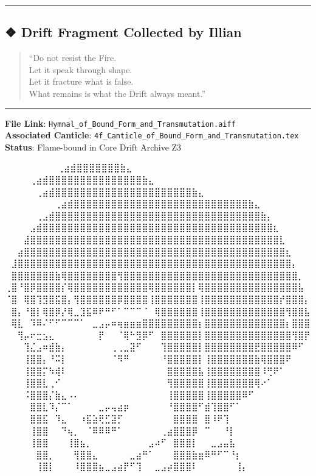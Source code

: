 \documentclass[
]{article}
\begin{document}
\begin{center}\rule{0.5\linewidth}{0.5pt}\end{center}

\hypertarget{drift-fragment-collected-by-illian-1}{%
\subsection{❖ Drift Fragment Collected by
Illian}\label{drift-fragment-collected-by-illian-1}}

\begin{quote}
``Do not resist the Fire.\\
Let it speak through shape.\\
Let it fracture what is false.\\
What remains is what the Drift always meant.''
\end{quote}

\begin{center}\rule{0.5\linewidth}{0.5pt}\end{center}

\textbf{File Link}:
\texttt{Hymnal\_of\_Bound\_Form\_and\_Transmutation.aiff}\\
\textbf{Associated Canticle}:
\texttt{4f\_Canticle\_of\_Bound\_Form\_and\_Transmutation.tex}\\
\textbf{Status}: Flame-bound in Core Drift Archive Z3

⠀⠀⠀⠀⠀⠀ ⠀⠀⢀⣴⣾⣿⣿⣿⣿⣿⣿⣿⣷⣄⠀⠀⠀⠀⠀⠀⠀⠀ ⠀⠀⠀ ⠀ ⠀⠀⠀⠀⢀⣴⣾⣿⣿⣿⣿⣿⣿⣿⣿⣿⣿⣿⣿⣿⣿⣿⣷⣄⠀⠀⠀⠀⠀⠀⠀⠀ ⠀⠀
⠀ ⠀⠀⠀⠀⠀⢀⣴⣾⣿⣿⣿⣿⣿⣿⣿⣿⣿⣿⣿⣿⣿⣿⣿⣿⣿⣿⣿⣿⣿⣿⣷⣄⠀⠀⠀⠀⠀⠀⠀⠀
⠀⠀⠀⠀⠀⠀⠀⠀⢀⣴⣾⣿⣿⣿⣿⣿⣿⣿⣿⣿⣿⣿⣿⣿⣿⣿⣿⣿⣿⣿⣿⣿⣿⣿⣿⣿⣿⣿⣿⣷⣄⠀⠀⠀⠀⠀⠀⠀⠀
⠀⠀⠀⠀⠀⢀⣠⣾⣿⣿⣿⣿⣿⣿⣿⣿⣿⣿⣿⣿⣿⣿⣿⣿⣿⣿⣿⣿⣿⣿⣿⣿⣿⣿⣿⣿⣿⣿⣿⣿⣿⣷⡄⠀⠀⠀⠀⠀⠀
⠀⠀⠀⠀⣠⣾⣿⣿⣿⣿⣿⣿⣿⣿⣿⣿⣿⣿⣿⣿⣿⣿⣿⣿⣿⣿⣿⣿⣿⣿⣿⣿⣿⣿⣿⣿⣿⣿⣿⣿⣿⣿⣿⣆⠀⠀⠀⠀⠀
⠀⠀⠀⣼⣿⣿⣿⣿⣿⣿⣿⣿⣿⣿⣿⣿⣿⣿⣿⣿⣿⣿⣿⣿⣿⣿⣿⣿⣿⣿⣿⣿⣿⣿⣿⣿⣿⣿⣿⣿⣿⣿⣿⣿⣇⠀⠀⠀⠀
⠀⠀⣴⣿⣿⣿⣿⣿⣿⣿⣿⣿⣿⣿⣿⣿⣿⣿⣿⣿⣿⣿⣿⣿⣿⣿⣿⣿⣿⣿⣿⣿⣿⣿⣿⣿⣿⣿⣿⣿⣿⣿⣿⣿⣿⣆⠀⠀⠀
⠀⣸⣿⣿⣿⣿⣿⣿⣿⣿⣿⣿⣿⣿⣿⣿⣿⣿⣿⣿⣿⣿⣿⣿⣿⣿⣿⣿⣿⣿⣿⣿⣿⣿⣿⣿⣿⣿⣿⣿⣿⣿⣿⣿⣿⣿⡄⠀⠀
⠀⣿⣿⣿⣿⣿⣿⣿⣷⢿⣿⣿⣿⣿⣿⣿⣿⣿⢻⣿⣿⣿⣿⣿⣿⣿⣿⣿⣿⣿⣿⣿⣿⣿⣿⣿⣿⣿⣿⣿⣿⣿⣿⣿⣿⣿⣿⡀⠀
⢀⣿⠘⣿⡿⣿⣿⣿⣿⡎⢿⣿⣿⣿⣿⣿⣿⣿⣿⣿⣿⣿⣿⢿⣿⣿⣿⣿⣿⣿⡇⢿⣿⣿⣿⣿⣿⣿⣿⣿⣿⣿⣿⣿⣿⣿⣿⣧⠀
⠈⣿⠀⢿⣿⢹⣻⣿⣯⣿⡄⢻⣿⣿⣿⣿⣿⣿⡿⣿⣿⣿⣿⢸⣿⣿⣿⣿⣿⣿⣿⢸⣿⣿⣿⣿⣿⣿⣿⣿⣿⣿⣿⣿⡞⣿⣿⣿⡄
⠀⣿⡄⠘⣿⡇⢿⣿⡿⡜⢿⣀⣹⣯⠿⠟⠛⠋⠁⠉⠉⠉⠈⠀⢿⣿⣿⣿⣿⣿⣿⢸⣿⣿⣿⣿⣿⣿⣿⣿⣿⣿⣿⣿⣿⢻⣿⣿⣧
⠀⢿⣇⠀⠹⠿⠌⠋⠋⠉⠉⠉⠁⠀⣀⣠⡤⠶⢶⣶⣶⣶⣿⣿⣿⣿⣿⣿⣿⣿⣿⡆⣿⣿⣿⣿⣿⣿⣿⣿⣿⣿⣿⣿⣿⡆⣿⣿⣿
⠀⠀⢻⡤⠖⣒⣢⣄⠀⠀⠀⠀⠀⠀⠀⡟⠀⠀⠈⢿⠓⣻⡿⠋⠀⣿⣿⣿⣿⣿⣿⡇⣿⣿⣿⣿⣿⣿⣿⣿⣿⣿⣿⣿⣿⣿⢻⣿⡟
⠀⠀⠀⢹⣌⣠⠶⣾⣷⡄⠀⠀⠀⠀⠀⠀⠀⢀⢀⣀⣽⠋⠀⠀⠀⢹⣿⣿⣿⣿⣿⡇⣿⣿⣿⣿⣿⣿⣿⣿⣟⣿⣿⣿⣿⣿⠿⠋⠀
⠀⠀⠀⢸⣿⣿⡄⠘⠭⡇⠀⠀⠀⠀⠀⠀⠀⠈⠻⠛⠀⠀⠀⠀⠀⠘⣿⣿⣿⣿⣿⡇⢸⣿⣿⣿⣿⣿⣿⣿⣷⢿⣿⣿⣿⠟⠀⠀⠀
⠀⠀⠀⢸⣿⣿⡍⠳⢾⠇⠀⠀⠀⠀⠀⠀⠀⠀⠀⠀⠀⠀⠀⠀⠀⠀⣿⣿⣿⣿⣿⣧⢸⣿⣿⣿⣿⣿⣿⣿⣿⠸⢛⠟⠁⠀⠀⠀⠀
⠀⠀⠀⢸⣿⣿⣇⢀⠊⠀⠀⠀⠀⠀⠀⠀⠀⠀⠀⠀⠀⠀⠀⠀⠀⠀⢻⣿⣿⣿⣿⣿⢸⣿⣿⣿⣿⣿⣿⣿⢿⠔⠁⠀⠀⠀⠀⠀⠀
⠀⠀⠀⠨⣿⣿⣿⡌⣷⣄⠠⠄⠀⠀⠀⠀⠀⠀⠀⠀⠀⠀⠀⠀⠀⠀⢸⣿⣿⣿⣿⣿⢸⣿⣿⣿⣿⣿⠿⠋⠀⠀⠀⠀⠀⠀⠀⠀⠀
⠀⠀⠀⠀⣿⣿⣇⠹⡌⠉⠁⠀⠀⠀⠀⣀⡤⢤⣴⡶⠀⠀⠀⠀⠀⠀⠘⣿⣿⣿⣿⠋⣾⢹⣿⣿⠋⠁⠀⠀⠀⠀⠀⠀⠀⠀⠀⠀⠀
⠀⠀⠀⠀⣿⣿⣯⠀⠹⣄⠀⠀⠰⣯⣵⢟⣋⣽⡋⠀⠀⠀⠀⠀⠀⠀⠀⣿⣿⣿⣿⠀⣿⠸⠟⢹⠀⠀⠀⠀⠀⠀⠀⠀⠀⠀⠀⠀⠀
⠀⠀⠀⠀⢸⣿⣿⠀⠀⠙⢦⡀⠀⠈⠿⠿⠿⠛⠁⠀⠀⠀⠀⠀⠀⢀⣴⣿⣿⣿⡿⠀⠉⠀⠀⠘⡇⠀⠀⠀⠀⠀⠀⠀⠀⠀⠀⠀⠀
⠀⠀⠀⠀⢸⣿⣿⠀⠀⠀⢸⣿⣦⡀⠀⠀⠀⠀⠀⠀⠀⠀⠀⣠⠴⠋⠀⣿⣿⣿⡇⠀⠀⣀⣠⣤⣧⠀⠀⠀⠀⠀⠀⠀⠀⠀⠀⠀⠀
⠀⠀⠀⠀⠀⣿⣿⡀⠀⠀⠀⢻⣿⣿⣄⠀⠀⠀⠀⠀⣀⣴⠛⠁⠀⠀⠀⣿⣿⣿⣷⣶⠿⠛⠋⠉⠘⡆⠀⠀⠀⠀⠀⠀⠀⠀⠀⠀⠀
⠀⠀⠀⠀⠀⢸⣿⡇⠀⠀⠀⠸⣿⣿⣿⣦⣀⣠⣴⡟⠋⢹⠀⠀⣀⣠⡴⣿⣿⣿⠇⠀⠀⠀⠀⠀⠀⢸⡄⠀⠀⠀⠀⠀⠀⠀⠀⠀⠀
\end{document}
